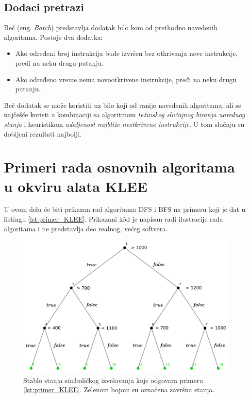 \documentclass[12pt,oneside]{memoir}
\begin{document}
\subsection{Dodaci pretrazi} 
Beč (eng. \textit{Batch}) predstavlja dodatak bilo kom od prethodno navedenih algoritama. Postoje dva dodatka:
\begin{itemize}
    \item Ako određeni broj instrukcija bude izvršen bez otkrivanja nove instrukcije, pređi na neku drugu putanju.
    
    \item Ako određeno vreme nema novootkrivene instrukcije, pređi na neku drugu putanju.
\end{itemize}
Beč dodatak se može koristiti uz bilo koji od ranije navedenih algoritama, ali se najčešće koristi u kombinaciji sa algoritmom \textit{težinskog slučajnog biranja narednog stanja} i heuristikom \textit{udaljenost najbliže neotkrivene instrukcije}. U tom slučaju su dobijeni rezultati najbolji.

\newpage

\section{Primeri rada osnovnih algoritama u okviru alata KLEE} \label{osnovni_algoritmi}
U ovom delu će biti prikazan rad algoritama DFS i BFS na primeru koji je dat u listingu \ref{lst:primer_KLEE}. Prikazani k\^od je napisan radi ilustracije rada algoritama i ne predstavlja deo realnog, većeg softvera.

\vskip 1.5in

\begin{figure}[ht]
    \centering
    \includegraphics[width=\linewidth]{stablo_primer_1.png}
    \caption{Stablo stanja simboličkog izvršavanja koje odgovara primeru \ref{lst:primer_KLEE}. Zelenom bojom su označena završna stanja.}
    \label{fig:moj_primer}
\end{figure}
\end{document}
